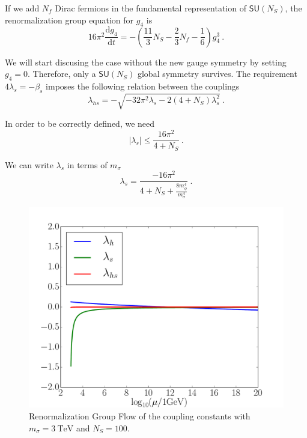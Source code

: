 \documentclass[aps,prd,preprintnumbers,nofootinbibn,twocolumn]{revtex4}
\newcommand{\dif}{\mathrm{d}}
\begin{document}
If we add $N_f$ Dirac fermions in the fundamental representation of $\mathsf{SU}(N_S)$, the renormalization group equation for $g_4$ is 
\begin{equation}
16\pi^2 \frac{\dif g_4}{\dif t} = -\left(\frac{11}{3}N_S-\frac{2}{3}N_f -\frac{1}{6}\right)g_4^3\ .
\end{equation}

We will start discusing the case without the new gauge symmetry by setting $g_4=0$. Therefore, only a $\mathsf{SU}(N_S)$ global symmetry survives. The requirement $4\lambda_s = -\beta_s$ imposes the following relation between the couplings
\begin{equation}\label{eq:lhs}
\lambda_{hs}=-\sqrt{-32\pi^2 \lambda_s -2(4+N_S)\lambda_s^2}\ .
\end{equation}

In order to be correctly defined, we need
\begin{equation}
|\lambda_s| \leq \frac{16\pi^2}{4+N_S}\ . \label{eq:lim_ls}
\end{equation}

We can write $\lambda_s$ in terms of $m_\sigma$
\begin{equation}\label{eq:ls}
\lambda_s = \frac{-16\pi^2}{4+N_S+\frac{8m_\phi^4}{m_\sigma^4}}\ .
\end{equation}

\begin{figure}[t]
\centering
\includegraphics[width=\columnwidth]{scenario1}
\caption{Renormalization Group Flow of the coupling constants with $m_\sigma = \SI{3}{\tera\electronvolt}$ and $N_S=100$.}\label{fig:sce1}
\end{figure}
\end{document}

